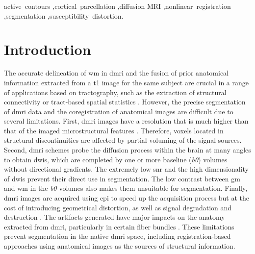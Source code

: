 \documentclass[3p,authoryear,fleqn]{elsarticle}
\begin{document}
\begin{frontmatter}
\begin{keyword}
active~contours \sep cortical~parcellation \sep diffusion MRI \sep nonlinear~registration \sep segmentation \sep susceptibility~distortion.
\end{keyword}

\end{frontmatter}

\linenumbers
\makeatletter{}\section{Introduction}\label{sec:introduction}
The accurate delineation of \gls*{wm} in \gls*{dmri} and the fusion of prior
  anatomical information extracted from a \gls*{t1} image for the same subject
  are crucial in a range of applications based on tractography, such as
  the extraction of structural connectivity \citep{craddock_imaging_2013} or
  tract-based spatial statistics \citep{smith_tractbased_2006}.
However, the precise segmentation of \gls*{dmri} data and the coregistration of anatomical
  images are difficult due to several limitations.
First, \gls{dmri} images have a resolution that is much higher than that of the imaged
  microstructural features \citep{basser_microstructural_1996}.
Therefore, voxels located in structural discontinuities are affected by partial
  voluming of the signal sources.
Second, \gls*{dmri} schemes probe the diffusion process within the brain at
  many angles to obtain \glspl*{dwi}, which are completed by one or more baseline (\emph{b0})
  volumes without directional gradients.
The extremely low \gls*{snr} and the high dimensionality of \glspl*{dwi} prevent their
  direct use in segmentation.
The low contrast between \gls*{gm} and \gls*{wm} in the \emph{b0} volumes also makes them unsuitable for
  segmentation.
Finally, \gls*{dmri} images are acquired using \gls*{epi} to speed up the acquisition process but
  at the cost of introducing geometrical distortion, as well as signal degradation and
  destruction \citep{jezzard_correction_1995}.
The artifacts generated have major impacts on the anatomy extracted
  from \gls*{dmri}, particularly in certain fiber bundles \citep{irfanoglu_effects_2012}.
These limitations prevent segmentation in the native \gls*{dmri} space, including
  registration-based approaches using anatomical images as the sources of structural
  information.
\end{document}
